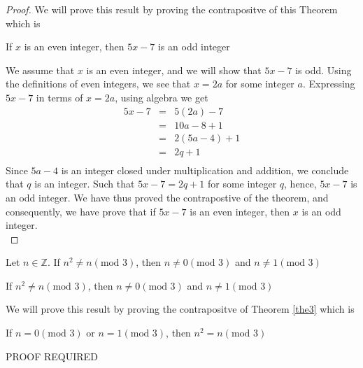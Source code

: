 \begin{proof}
We will prove this result by proving the contrapositve of this Theorem which is
	\begin{center}
		If $x$ is an even integer, then $5x - 7$ is an odd integer
	\end{center}

We assume that $x$ is an even integer, and we will show that $5x - 7$ is odd. Using the definitions of even integers, we see that $x = 2a$ for some integer $a$. Expressing $5x - 7$ in terms of $x = 2a$, using algebra we get
	\begin{eqnarray*}
		5x - 7 & = & 5(2a) - 7  \nonumber \\
		& = & 10a - 8 + 1 \nonumber \\
		& = & 2(5a - 4) + 1 \nonumber \\
		& = & 2q + 1 \nonumber \\
	\end{eqnarray*}
Since $5a - 4$ is an integer closed under multiplication and addition, we conclude that $q$ is an integer. Such that $5x - 7 = 2q + 1$ for some integer $q$, hence, $5x - 7$ is an odd integer. We have thus proved the contrapostive of the theorem, and consequently, we have prove that if $5x - 7$ is an even integer, then $x$ is an odd integer. \\
\end{proof}


















\begin{example}
Let $n \in \mathbb{Z}$. If $n^2 \neq n (\text{mod 3})$, then $n \neq 0 (\text{mod 3})$ and $n \neq 1 (\text{mod 3})$

\begin{tcolorbox}
	\begin{theorem}
	\label{the3}
		If $n^2 \neq n (\text{mod 3})$, then $n \neq 0 (\text{mod 3})$ and $n \neq 1 (\text{mod 3})$
	\end{theorem}
\end{tcolorbox}

We will prove this result by proving the contrapositve of Theorem \ref{the3} which is
	\begin{center}
		If $n = 0 (\text{mod 3})$ or $n = 1 (\text{mod 3})$, then $n^2 = n (\text{mod 3})$
	\end{center}
PROOF REQUIRED

\end{example}




